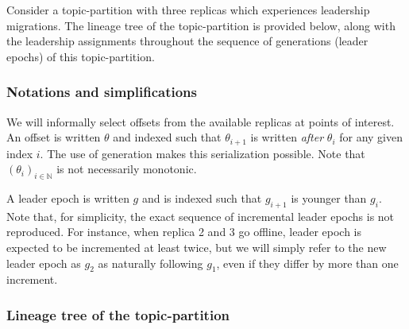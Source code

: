\documentclass{article}
\begin{document}
Consider a topic-partition with three replicas which experiences leadership migrations. The lineage tree of the topic-partition is provided below, along with the leadership assignments throughout the sequence of generations (leader epochs) of this topic-partition.

\subsubsection{Notations and simplifications}

We will informally select offsets from the available replicas at points of interest. An offset is written $\theta$ and indexed such that $\theta_{i+1}$ is written \textit{after} $\theta_i$ for any given index $i$. The use of generation makes this serialization possible. Note that $(\theta_i)_{i \in \mathbb{N}}$ is not necessarily monotonic.

A leader epoch is written $g$ and is indexed such that $g_{i+1}$ is younger than $g_i$. Note that, for simplicity, the exact sequence of incremental leader epochs is not reproduced. For instance, when replica 2 and 3 go offline, leader epoch is expected to be incremented at least twice, but we will simply refer to the new leader epoch as $g_2$ as naturally following $g_1$, even if they differ by more than one increment.

\subsubsection{Lineage tree of the topic-partition}



\newpage

{}
\end{document}
